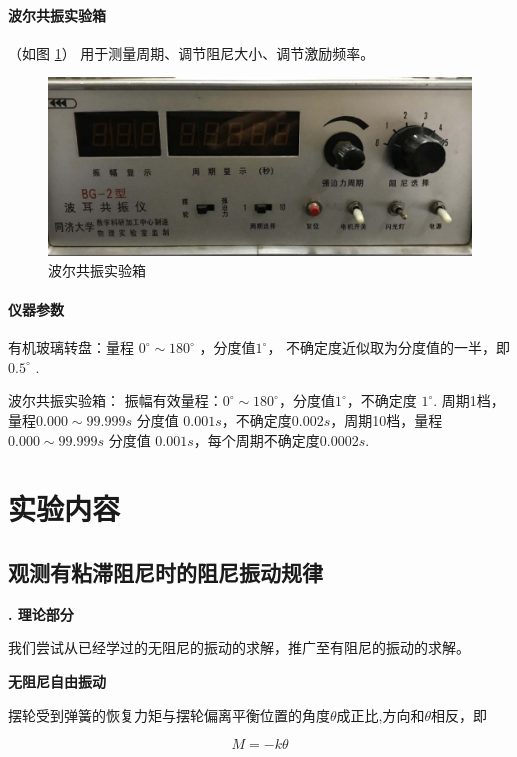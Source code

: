 \documentclass[a4paper,11pt]{article}
\begin{document}
\paragraph{波尔共振实验箱}
    （如图 \ref{pic2}）
    用于测量周期、调节阻尼大小、调节激励频率。
    \begin{figure}[ht]
        \centering
        \includegraphics[scale=0.6]{box.png}
        \caption{波尔共振实验箱}
        \label{pic2}
    \end{figure}

\paragraph{仪器参数}
有机玻璃转盘：量程 $0^{\circ} \sim 180^{\circ}$ ，分度值$1^{\circ}$， 不确定度近似取为分度值的一半，即 $0.5^{\circ}$ .

波尔共振实验箱： 振幅有效量程：$0^{\circ} \sim 180^{\circ}$，分度值$ 1^{\circ}$，不确定度 $1^{\circ}$. 周期1档，量程$0.000 \sim  99.999s $ 分度值 $0.001s$，不确定度$0.002s$，周期10档，量程$0.000 \sim  99.999s $ 分度值 $0.001s$，每个周期不确定度$0.0002s$.

\section{实验内容}
    \subsection{观测有粘滞阻尼时的阻尼振动规律}
        \textbf{. 理论部分}

        我们尝试从已经学过的无阻尼的振动的求解，推广至有阻尼的振动的求解。

        \textbf{无阻尼自由振动}
        
        摆轮受到弹簧的恢复力矩与摆轮偏离平衡位置的角度$ \theta $成正比,方向和$ \theta $相反，即

        \begin{equation}
            M = -k \theta
        \end{equation}
\end{document}
